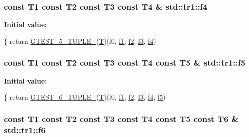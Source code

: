 \hypertarget{namespacestd_1_1tr1_adc796e02b7385d526aff708189564f67}{
\subsubsection[{f4}]{\setlength{\rightskip}{0pt plus 5cm}const T1 const T2 const T3 const T4 \& std\-::tr1\-::f4}}\label{namespacestd_1_1tr1_adc796e02b7385d526aff708189564f67}
{\bfseries Initial value\-:}
\begin{DoxyCode}
\{
  \textcolor{keywordflow}{return} \hyperlink{ts__gtest_8h_a64e6f4a4cf55f62cde94066c6d5d5c74}{GTEST\_5\_TUPLE\_}(\hyperlink{calib3d_8hpp_a3efb9551a871ddd0463079a808916717}{T})(f0, \hyperlink{namespacestd_1_1tr1_a9c0fa65b105f8e2f58ba59ecf75fd000}{f1}, \hyperlink{namespacestd_1_1tr1_a87dd9e009868361317f587126dba63d4}{f2}, \hyperlink{namespacestd_1_1tr1_a0f7c3b47d27d42d82d1a333ea420ce4e}{f3}, \hyperlink{namespacestd_1_1tr1_adc796e02b7385d526aff708189564f67}{f4})
\end{DoxyCode}
\hypertarget{namespacestd_1_1tr1_a9c1eb66b2b2fa321942af95405232a0d}{
\subsubsection[{f5}]{\setlength{\rightskip}{0pt plus 5cm}const T1 const T2 const T3 const T4 const T5 \& std\-::tr1\-::f5}}\label{namespacestd_1_1tr1_a9c1eb66b2b2fa321942af95405232a0d}
{\bfseries Initial value\-:}
\begin{DoxyCode}
\{
  \textcolor{keywordflow}{return} \hyperlink{ts__gtest_8h_a53f36c86a979ed8285bf3c6f82f16483}{GTEST\_6\_TUPLE\_}(\hyperlink{calib3d_8hpp_a3efb9551a871ddd0463079a808916717}{T})(f0, \hyperlink{namespacestd_1_1tr1_a9c0fa65b105f8e2f58ba59ecf75fd000}{f1}, \hyperlink{namespacestd_1_1tr1_a87dd9e009868361317f587126dba63d4}{f2}, \hyperlink{namespacestd_1_1tr1_a0f7c3b47d27d42d82d1a333ea420ce4e}{f3}, \hyperlink{namespacestd_1_1tr1_adc796e02b7385d526aff708189564f67}{f4}, \hyperlink{namespacestd_1_1tr1_a9c1eb66b2b2fa321942af95405232a0d}{f5})
\end{DoxyCode}
\hypertarget{namespacestd_1_1tr1_a6b62f32e1e3e21bceb94eb46c4cbfd56}{
\subsubsection[{f6}]{\setlength{\rightskip}{0pt plus 5cm}const T1 const T2 const T3 const T4 const T5 const T6 \& std\-::tr1\-::f6}}\label{namespacestd_1_1tr1_a6b62f32e1e3e21bceb94eb46c4cbfd56}
